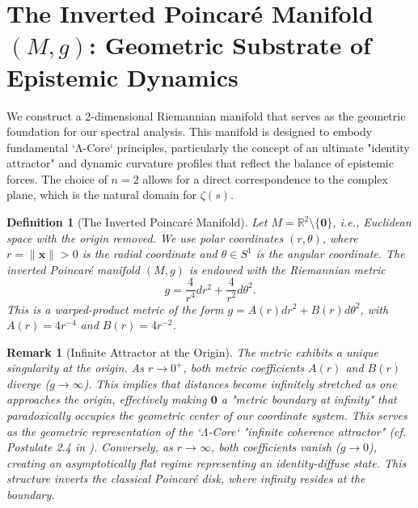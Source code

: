 \documentclass[12pt]{article}
\newtheorem{definition}[theorem]{Definition}
\newtheorem{remark}[theorem]{Remark}
\begin{document}
\section{The Inverted Poincar\'e Manifold $(M, g)$: Geometric Substrate of Epistemic Dynamics}

We construct a 2-dimensional Riemannian manifold that serves as the geometric foundation for our spectral analysis. This manifold is designed to embody fundamental `Λ-Core` principles, particularly the concept of an ultimate "identity attractor" and dynamic curvature profiles that reflect the balance of epistemic forces. The choice of $n=2$ allows for a direct correspondence to the complex plane, which is the natural domain for $\zeta(s)$.

\begin{definition}[The Inverted Poincar\'e Manifold]
Let $M = \mathbb{R}^2 \setminus \{\mathbf{0}\}$, i.e., Euclidean space with the origin removed. We use polar coordinates $(r, \theta)$, where $r = \|\mathbf{x}\| > 0$ is the radial coordinate and $\theta \in S^1$ is the angular coordinate. The \textit{inverted Poincar\'e manifold} $(M, g)$ is endowed with the Riemannian metric
\begin{equation} \label{eq:metric}
g = \frac{4}{r^4} dr^2 + \frac{4}{r^2} d\theta^2.
\end{equation}
This is a warped-product metric of the form $g = A(r)dr^2 + B(r)d\theta^2$, with $A(r) = 4r^{-4}$ and $B(r) = 4r^{-2}$.
\end{definition}

\begin{remark}[Infinite Attractor at the Origin]
The metric exhibits a unique singularity at the origin. As $r \to 0^+$, both metric coefficients $A(r)$ and $B(r)$ diverge ($g \to \infty$). This implies that distances become infinitely stretched as one approaches the origin, effectively making $\mathbf{0}$ a "metric boundary at infinity" that paradoxically occupies the geometric center of our coordinate system. This serves as the geometric representation of the `Λ-Core` "infinite coherence attractor" (cf. Postulate 2.4 in \cite{iyer2024metaphysics}). Conversely, as $r \to \infty$, both coefficients vanish ($g \to 0$), creating an asymptotically flat regime representing an identity-diffuse state. This structure inverts the classical Poincar\'e disk, where infinity resides at the boundary.
\end{remark}
\end{document}
